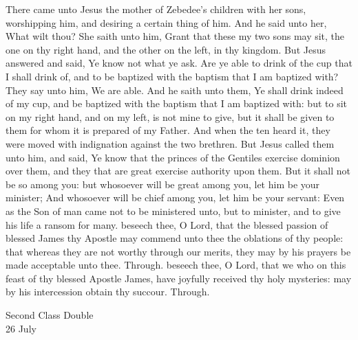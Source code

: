  There came unto Jesus the mother of Zebedee's children with her sons, worshipping him, and desiring a certain thing of him. And he said unto her, What wilt thou? She saith unto him, Grant that these my two sons may sit, the one on thy right hand, and the other on the left, in thy kingdom. But Jesus answered and said, Ye know not what ye ask. Are ye able to drink of the cup that I shall drink of, and to be baptized with the baptism that I am baptized with? They say unto him, We are able. And he saith unto them, Ye shall drink indeed of my cup, and be baptized with the baptism that I am baptized with: but to sit on my right hand, and on my left, is not mine to give, but it shall be given to them for whom it is prepared of my Father. And when the ten heard it, they were moved with indignation against the two brethren. But Jesus called them unto him, and said, Ye know that the princes of the Gentiles exercise dominion over them, and they that are great exercise authority upon them. But it shall not be so among you: but whosoever will be great among you, let him be your minister; And whosoever will be chief among you, let him be your servant: Even as the Son of man came not to be ministered unto, but to minister, and to give his life a ransom for many.
\secret
{} beseech thee, O Lord, that the blessed passion of blessed James thy Apostle may commend unto thee the oblations of thy people: that whereas they are not worthy through our merits, they may by his prayers be made acceptable unto thee. Through.
\postcommunion
{} beseech thee, O Lord, that we who on this feast of thy blessed Apostle James, have joyfully received thy holy mysteries: may by his intercession obtain thy succour. Through.

\begin{inhead}
    {Second Class Double\\
26 July}
\end{inhead}

